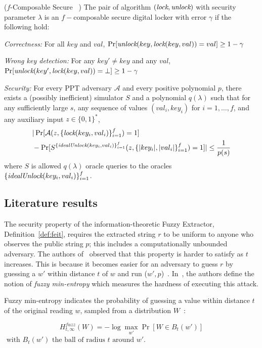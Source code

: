 \begin{definition}{($f$-Composable Secure \dl~\cite{reusablefe})}\label{def:dl}
The pair of algorithm $(\textit{lock},\textit{unlock})$ with security parameter $\lambda$ is an $f-$composable secure digital locker with error $\gamma$ if the following hold:

\textit{Correctness:} For all $key$ and $val$, $\Pr[\textit{unlock}(key, \textit{lock}(key, val)) = val] \geq 1 - \gamma$

\textit{Wrong key detection:} For any $key'\neq key$ and any $val$,\\  $\Pr[\textit{unlock}(key', \textit{lock}(key, val))= \bot] \geq 1 - \gamma$
 
\textit{Security:} For every PPT adversary $\mathcal{A}$ and every positive polynomial $p$, there exists a (possibly inefficient) simulator $S$ and a polynomial $q(\lambda)$ such that for any sufficiently large $s$, any sequence of values $(val_i, key_i)$ for $i = 1,\dots,f$, and any auxiliary input $z \in \{0, 1\}^\ast$,
\begin{align*}
& |\Pr[\mathcal{A}(z,\{\textit{lock}(key_i,val_i)\}^f_{i=1})=1] \\
&  -\Pr[S^{\{\textit{idealUnlock}(key_i,val_i)\}^f_{i=1}}(z,\{|key_i|,|val_i|\}^f_{i=1})=1]| \leq \frac{1}{p(s)}
\end{align*}
where $S$ is allowed $q(\lambda)$ oracle queries to the oracles $\{\textit{idealUnlock}(key_i,val_i)\}^f_{i=1}$.
\end{definition}


\subsection{Literature results}\label{subsec:res}
The security property of the information-theoretic Fuzzy Extractor, Definition~\ref{def:feit}, requires the extracted string $r$ to be uniform to anyone who observes the public string $p$; this includes a computationally unbounded adversary.
The authors of~\cite{fe-when?} observed that this property is harder to satisfy as $t$ increases. This is because it becomes easier for an adversary to guess $r$ by guessing a $w'$ within distance $t$ of $w$ and run \rep($w',p$)~\cite{fe-when?}. 
In~\cite{fe-when?}, the authors define the notion of \emph{fuzzy min-entropy} which measures the hardness of executing this attack. 

Fuzzy min-entropy indicates the probability of guessing a value within distance $t$ of the original reading $w$, sampled from a distribution $W$~\cite{fe-when?}:

$$ H^{fuzz}_{t,\infty}(W) = - \log\max_{w'}\Pr[W \in B_t(w')]$$
$\text{ with } B_t(w') \text{ the ball of radius }t\text{ around }w'$.


